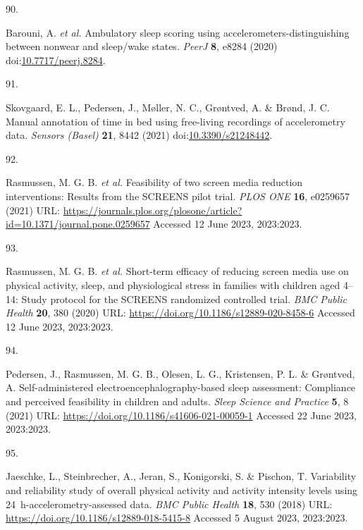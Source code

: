 \documentclass[
  9pt,
]{scrbook}
\newlength{\cslhangindent}
\newlength{\csllabelwidth}
\newlength{\cslentryspacingunit} %
\newenvironment{CSLReferences}[2] %
 {%
  \setlength{\parindent}{0pt}
  \ifodd #1
  \let\oldpar\par
  \def\par{\hangindent=\cslhangindent\oldpar}
  \fi
  \setlength{\parskip}{#2\cslentryspacingunit}
 }%
 {}
\newcommand{\CSLLeftMargin}[1]{\parbox[t]{\csllabelwidth}{#1}}
\newcommand{\CSLRightInline}[1]{\parbox[t]{\linewidth - \csllabelwidth}{#1}\break}
\begin{document}
\begin{CSLReferences}{0}{0}
\leavevmode{}%
\CSLLeftMargin{90. }%
\CSLRightInline{Barouni, A. \emph{et al.} Ambulatory sleep scoring using
accelerometers-distinguishing between nonwear and sleep/wake states.
\emph{{PeerJ}} \textbf{8}, e8284 (2020)
doi:\href{https://doi.org/10.7717/peerj.8284}{10.7717/peerj.8284}.}

\leavevmode{}%
\CSLLeftMargin{91. }%
\CSLRightInline{Skovgaard, E. L., Pedersen, J., Møller, N. C., Grøntved,
A. \& Brønd, J. C. Manual annotation of time in bed using free-living
recordings of accelerometry data. \emph{Sensors (Basel)} \textbf{21},
8442 (2021)
doi:\href{https://doi.org/10.3390/s21248442}{10.3390/s21248442}.}

\leavevmode{}%
\CSLLeftMargin{92. }%
\CSLRightInline{Rasmussen, M. G. B. \emph{et al.} Feasibility of two
screen media reduction interventions: Results from the {SCREENS} pilot
trial. \emph{{PLOS} {ONE}} \textbf{16}, e0259657 (2021) URL:
\url{https://journals.plos.org/plosone/article?id=10.1371/journal.pone.0259657}
Accessed 12 June 2023, 2023:2023.}

\leavevmode{}%
\CSLLeftMargin{93. }%
\CSLRightInline{Rasmussen, M. G. B. \emph{et al.} Short-term efficacy of
reducing screen media use on physical activity, sleep, and physiological
stress in families with children aged 4--14: Study protocol for the
{SCREENS} randomized controlled trial. \emph{{BMC} Public Health}
\textbf{20}, 380 (2020) URL:
\url{https://doi.org/10.1186/s12889-020-8458-6} Accessed 12 June 2023,
2023:2023.}

\leavevmode{}%
\CSLLeftMargin{94. }%
\CSLRightInline{Pedersen, J., Rasmussen, M. G. B., Olesen, L. G.,
Kristensen, P. L. \& Grøntved, A. Self-administered
electroencephalography-based sleep assessment: Compliance and perceived
feasibility in children and adults. \emph{Sleep Science and Practice}
\textbf{5}, 8 (2021) URL:
\url{https://doi.org/10.1186/s41606-021-00059-1} Accessed 22 June 2023,
2023:2023.}

\leavevmode{}%
\CSLLeftMargin{95. }%
\CSLRightInline{Jaeschke, L., Steinbrecher, A., Jeran, S., Konigorski,
S. \& Pischon, T. Variability and reliability study of overall physical
activity and activity intensity levels using 24~h-accelerometry-assessed
data. \emph{{BMC} Public Health} \textbf{18}, 530 (2018) URL:
\url{https://doi.org/10.1186/s12889-018-5415-8} Accessed 5 August 2023,
2023:2023.}


\end{CSLReferences}
\end{document}
